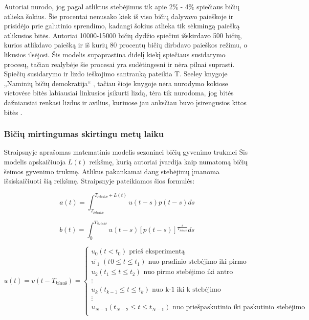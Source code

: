 \documentclass{VUMIFKompMagistrinis}
\begin{document}
Autoriai nurodo, jog pagal atliktus stebėjimus \cite{SeB99} tik apie 2\% - 4\% spiečiaus bičių atlieka šokius. Šie procentai nenusako kiek iš viso bičių dalyvavo paieškoje ir prisidėjo prie galutinio sprendimo, kadangi šokius atlieka tik sėkmingą paiešką atlikusios bitės. Autoriai 10000-15000 bičių dydžio spiečiui išskirdavo 500 bičių, kurios atlikdavo paiešką ir iš kurių 80 procentų bičių dirbdavo paieškos režimu, o likusios ilsėjosi.
Šis modelis supaprastina didelį kiekį spiečiaus susidarymo procesų, tačiau realybėje šie procesai yra sudėtingesni ir nėra pilnai suprasti. Spiečių susidarymo ir lizdo ieškojimo santrauką pateikia T. Seeley knygoje „Naminių bičių demokratija“ \cite{See10}, tačiau šioje knygoje nėra nurodymo kokiose vietovėse bitės labiausiai linkusios įsikurti lizdą, tėra tik nurodoma, jog bitės dažniausiai renkasi lizdus ir avilius, kuriuose jau anksčiau buvo įsirengusios kitos bitės \cite{VMS85}. 




\subsubsection{Bičių mirtingumas skirtingu metų laiku}

 Straipsnyje aprašomas matematinis modelis sezoninei bičių gyvenimo trukmei \cite{YYY19}
Šis modelis apskaičiuoja $L(t)$ reikšmę, kurią autoriai įvardija kaip numatomą bičių šeimos gyvenimo trukmę. Atlikus pakankamai daug stebėjimų įmanoma išsiskaičiuoti šią reikšmę. Straipsnyje pateikiamos šios formulės:

\begin{equation}
\label{emir1}
a(t)=\int_{T_{l\textit{\.e}liuk\textit{\.e}}}^{T_{l\textit{\.e}liuk\textit{\.e}}+L(t)}u(t-s)p(t-s)ds
\end{equation}

\begin{equation}
\label{emir2}
b(t)=\int_{0}^{T_{l\textit{\.e}liuk\textit{\.e}}}u(t-s)[p(t-s)]^{\frac{s}{T_{l\textit{\.e}liuk\textit{\.e}}}}ds
\end{equation}


\begin{equation}
\label{emir3}
u(t)=v(t-T_{kiau\textit{\v{s}}} )=
\begin{cases}
u_{0} (t<t_0 )  \text { prieš eksperimentą   }                                          \\
u ̅_{1} (t_{}0≤t≤t_{1} )  \text { nuo pradinio stebėjimo iki pirmo }                           \\
u_{2} (t_{1}≤t≤t_{2} )  \text { nuo pirmo stebėjimo iki antro }                               \\
\vdots \\
u_{k} (t_{k-1}≤t≤t_{k} )  \text { nuo k-1 iki k stebėjimo }                               \\
\vdots \\
u_{N-1} (t_{N-2}≤t≤t_{N-1} )  \text { nuo priešpaskutinio iki paskutinio stebėjimo } \\
\end{cases}
\end{equation}
\end{document}
